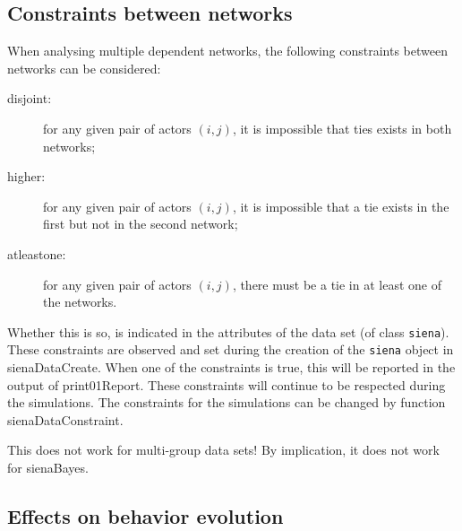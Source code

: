 \documentclass[a4paper,fleqn,11pt]{article}
\newcommand{\+}{\, + \,}
\newcommand{\sfn}[1]{\textsf{#1}}
\begin{document}
\subsection{Constraints between networks}
\label{S_constraints}

When analysing multiple dependent networks, the following constraints
between networks can be considered:
\begin{description}
  \item[disjoint:] for any given pair of actors $(i,j)$,
      it is impossible that ties exists in both networks;
  \item[higher:] for any given pair of actors $(i,j)$,
      it is impossible that a tie exists in the first
      but not in the second network;
  \item[atleastone:] for any given pair of actors $(i,j)$,
     there must be a tie in at least one of the networks.
\end{description}
Whether this is so, is indicated in the attributes of the data set
(of class \texttt{siena}).
These constraints are observed and set during the creation of the
\texttt{siena} object in \sfn{sienaDataCreate}.
When one of the constraints is true,
this will be reported in the output of \sfn{print01Report}.
These constraints will continue to be respected during the simulations.
The constraints for the simulations can be changed by function
\sfn{sienaDataConstraint}.

This does not work for multi-group data sets! By implication,
it does not work for \sfn{sienaBayes}.


\subsection{Effects on behavior evolution}
\label{S_eff_beh}
\end{document}
